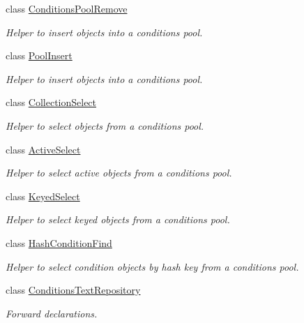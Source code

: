 \begin{DoxyCompactItemize}
class \hyperlink{class_d_d4hep_1_1_conditions_1_1_conditions_pool_remove}{ConditionsPoolRemove}
\begin{DoxyCompactList}\small\item\em Helper to insert objects into a conditions pool. \item\end{DoxyCompactList}\item 
class \hyperlink{class_d_d4hep_1_1_conditions_1_1_pool_insert}{PoolInsert}
\begin{DoxyCompactList}\small\item\em Helper to insert objects into a conditions pool. \item\end{DoxyCompactList}\item 
class \hyperlink{class_d_d4hep_1_1_conditions_1_1_collection_select}{CollectionSelect}
\begin{DoxyCompactList}\small\item\em Helper to select objects from a conditions pool. \item\end{DoxyCompactList}\item 
class \hyperlink{class_d_d4hep_1_1_conditions_1_1_active_select}{ActiveSelect}
\begin{DoxyCompactList}\small\item\em Helper to select active objects from a conditions pool. \item\end{DoxyCompactList}\item 
class \hyperlink{class_d_d4hep_1_1_conditions_1_1_keyed_select}{KeyedSelect}
\begin{DoxyCompactList}\small\item\em Helper to select keyed objects from a conditions pool. \item\end{DoxyCompactList}\item 
class \hyperlink{class_d_d4hep_1_1_conditions_1_1_hash_condition_find}{HashConditionFind}
\begin{DoxyCompactList}\small\item\em Helper to select condition objects by hash key from a conditions pool. \item\end{DoxyCompactList}\item 
class \hyperlink{class_d_d4hep_1_1_conditions_1_1_conditions_text_repository}{ConditionsTextRepository}
\begin{DoxyCompactList}\small\item\em Forward declarations. \item\end{DoxyCompactList}\end{DoxyCompactItemize}
